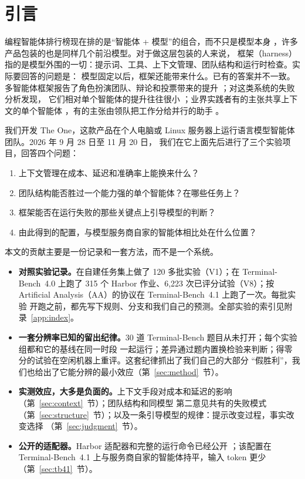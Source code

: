 \section{引言}
\label{sec:intro}

编程智能体排行榜现在排的是“智能体 + 模型”的组合，而不只是模型本身
\citep{tbench2026board,aa2026coding,kapoor2026hal}，许多产品包装的也是同样几个前沿模型。对于做这层包装的人来说，
框架（harness）指的是模型外围的一切：提示词、工具、上下文管理、团队结构和运行时检查。实际要回答的问题是：
模型固定以后，框架还能带来什么。已有的答案并不一致。多智能体框架报告了角色扮演团队、辩论和投票带来的提升
\citep{wu2024autogen,hong2024metagpt,qian2024chatdev,du2024debate,li2024moreagents}；对这类系统的失败分析发现，
它们相对单个智能体的提升往往很小 \citep{cemri2025mast}；业界实践者有的主张共享上下文的单个智能体
\citep{yan2025dontbuild}，有的主张由领队把工作分给并行的助手 \citep{anthropic2025multiagent}。

我们开发 The One，这款产品在个人电脑或 Linux 服务器上运行语言模型智能体团队。2026 年 9 月 28 日至 11 月 20 日，
我们在它上面先后进行了三个实验项目，回答四个问题：
\begin{enumerate}[label=\textbf{RQ\arabic*},leftmargin=3.2em]
  \item 上下文管理在成本、延迟和准确率上能换来什么？
  \item 团队结构能否胜过一个能力强的单个智能体？在哪些任务上？
  \item 框架能否在运行失败的那些关键点上引导模型的判断？
  \item 由此得到的配置，与模型服务商自家的智能体相比处在什么位置？
\end{enumerate}

本文的贡献主要是一份记录和一套方法，而不是一个系统。
\begin{itemize}[leftmargin=1.4em]
  \item \textbf{对照实验记录。}在自建任务集上做了 120 多批实验（V1）；在 Terminal-Bench~4.0 上跑了 315 个 Harbor
    作业、6,223 次已评分试验（V8）；按 Artificial Analysis（AA）的协议在 Terminal-Bench~4.1 上跑了一次。每批实验
    开跑之前，都先写下规则、分支和我们自己的预测。全部实验的索引见附录~\ref{app:index}。
  \item \textbf{一套分辨率已知的留出纪律。}30 道 Terminal-Bench 题目从未打开；每个实验组都和它的基线在同一时段
    一起运行；差异通过题内置换检验来判断；得零分的试验在空闲机器上重评。这套纪律抓出了我们自己的大部分
    “假胜利”，我们也给出了它能分辨的最小效应（第~\ref{sec:method}~节）。
  \item \textbf{实测效应，大多是负面的。}上下文手段对成本和延迟的影响（第~\ref{sec:context}~节）；团队结构和同模型
    第二意见共有的失败模式（第~\ref{sec:structure}~节）；以及一条引导模型的规律：提示改变过程，事实改变选择
    （第~\ref{sec:judgment}~节）。
  \item \textbf{公开的适配器。}Harbor 适配器和完整的运行命令已经公开 \citep{zhang2026adapter}；该配置在
    Terminal-Bench~4.1 上与服务商自家的智能体持平，输入 token 更少（第~\ref{sec:tb41}~节）。
\end{itemize}

